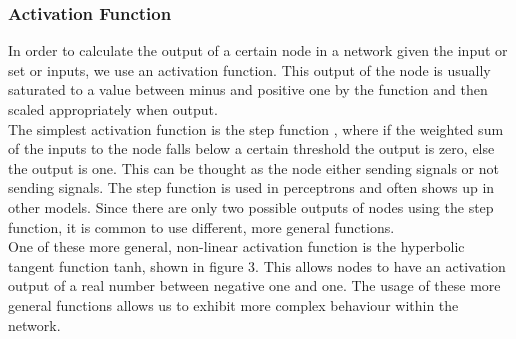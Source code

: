 \documentclass[11pt,a4paper]{article}
\begin{document}
\subsubsection*{Activation Function}
In order to calculate the output of a certain node in a network given the input or set or inputs, we use an activation function. \cite{activate} This output of the node is usually saturated to a value between minus and positive one by the function and then scaled appropriately when output. \cite{swarmann} \\

The simplest activation function is the step function \cite{nnm}, where if the weighted sum of the inputs to the node falls below a certain threshold the output is zero, else the output is one. This can be thought as the node either sending signals or not sending signals. The step function is used in perceptrons and often shows up in other models. \cite{percept} Since there are only two possible outputs of nodes using the step function, it is common to use different, more general functions.\\

One of these more general, non-linear activation function is the hyperbolic tangent function tanh, shown in figure 3. This allows nodes to have an activation output of a real number between negative one and one. The usage of these more general functions allows us to exhibit more complex behaviour within the network.
\begin{figure}[h]
\end{figure}
\newpage
\end{document}
